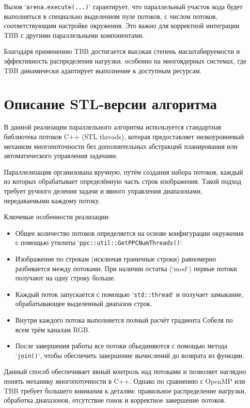 \documentclass[14pt,a4paper]{extarticle}
\begin{document}
Вызов `\texttt{arena.execute(...)}` гарантирует, что параллельный участок кода будет выполняться в специально выделенном пуле потоков, с числом потоков, 
соответствующим настройке окружения. Это важно для корректной интеграции TBB с другими параллельными компонентами.

Благодаря применению TBB достигается высокая степень масштабируемости и эффективность распределения нагрузки, особенно на многоядерных системах, 
где TBB динамически адаптирует выполнение к доступным ресурсам.

\section{Описание STL-версии алгоритма}

В данной реализации параллельного алгоритма используется стандартная библиотека потоков C++ (STL threads), 
которая предоставляет низкоуровневый механизм многопоточности без дополнительных абстракций планирования или автоматического управления задачами.

Параллелизация организована вручную, путём создания набора потоков, каждый из которых обрабатывает определённую часть строк изображения. 
Такой подход требует ручного деления задачи и явного управления диапазонами, передаваемыми каждому потоку.

Ключевые особенности реализации:

\begin{itemize}
    \item Общее количество потоков определяется на основе конфигурации окружения с помощью утилиты `\texttt{ppc::util::GetPPCNumThreads()}`.
    \item Изображение по строкам (исключая граничные строки) равномерно разбивается между потоками. При наличии остатка (`mod`) первые потоки получают на одну строку больше.
    \item Каждый поток запускается с помощью `\texttt{std::thread}` и получает замыкание, обрабатывающее выделенный диапазон строк.
    \item Внутри каждого потока выполняется полный расчёт градиента Собеля по всем трём каналам RGB.
    \item После завершения работы все потоки объединяются с помощью метода `\texttt{join()}`, чтобы обеспечить завершение вычислений до возврата из функции.
\end{itemize}

Данный способ обеспечивает явный контроль над потоками и позволяет наглядно понять механику многопоточности в C++. Однако по сравнению с OpenMP или TBB требует большего внимания к деталям: 
правильное распределение нагрузки, обработка диапазонов, отсутствие гонок и корректное завершение потоков.
\end{document}
